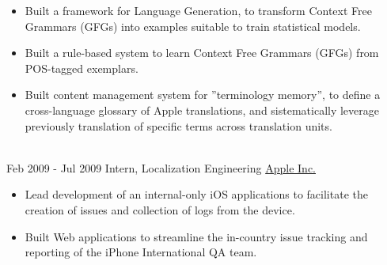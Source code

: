 \documentclass[letterpaper]{twentysecondcv} %
\begin{document}
\begin{twenty}
{{\begin{itemize}
        \item Built a framework for Language Generation, to transform Context Free Grammars (GFGs) into examples suitable to train statistical models.
        \item Built a rule-based system to learn Context Free Grammars (GFGs) from POS-tagged exemplars.
        \item Built content management system for ”terminology memory”, to define a cross-language glossary of Apple translations, and sistematically leverage previously translation of specific terms across translation units.
        \end{itemize}}
        }
    \\ 
     \twentyitem
   		{Feb 2009 -}
		{Jul 2009}
        {Intern, Localization Engineering}
        {\href{http://www.apple.com/}{Apple Inc.}}
        {}
        {
        \begin{itemize}
        \item Lead development of an internal-only iOS applications to facilitate the creation of issues and collection of logs from the device.
        \item Built Web applications to streamline the in-country issue tracking and reporting of the iPhone International QA team.
        \end{itemize}
    	}
     \\

\end{twenty}
\end{document}
